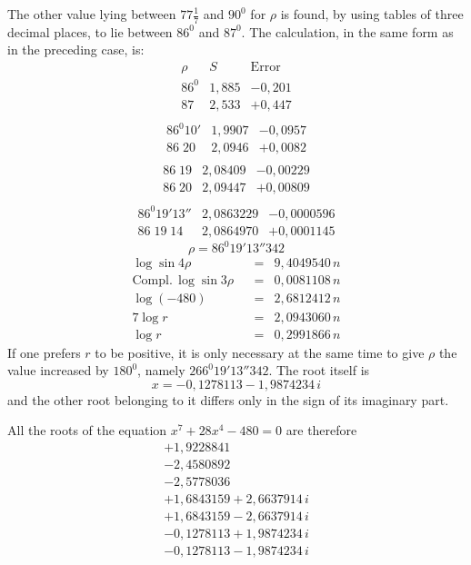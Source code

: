 The other value lying between $77\frac{1}{7}$ and $90^{0}$ for $\rho$ is found, by using tables of three decimal places, to lie between $86^{0}$ and $87^{0}$. The calculation, in the same form as in the preceding case, is:
\[
\begin{array}{c|r|r}
\rho&S&\mathrm{Error}\\
86^{0}&1{,}885&-0{,}201\\
87&2{,}533&+0{,}447\\
\end{array}
\]
\[
\begin{array}{c|r|r}
86^{0}10'&1{,}9907&-0{,}0957\\
86\;20&2{,}0946&+0{,}0082\\
\end{array}
\]
\[
\begin{array}{c|r|r}
86\;19&2{,}08409&-0{,}00229\\
86\;20&2{,}09447&+0{,}00809\\
\end{array}
\]
\[
\begin{array}{c|r|r}
86^{0}19'13''&2{,}0863229&-0{,}0000596\\
86\;19\;14&2{,}0864970&+0{,}0001145
\end{array}
\]
\[
\rho=86^{0}19'13''342
\]
\[
\begin{array}{lrcl}
\log\sin4\rho&&=&9{,}4049540\,n\\
\mathrm{Compl.}\,\log\sin3\rho&&=&0{,}0081108\,n\\
\log(-480)&&=&2{,}6812412\,n\\\hline
7\log r&&=&2{,}0943060\,n\\
\log r&&=&0{,}2991866\,n
\end{array}
\]
If one prefers $r$ to be positive, it is only necessary at the same time to give $\rho$ the value increased by $180^{0}$, namely $266^{0}19'13''342$. The root itself is
\[
x=-0{,}1278113-1{,}9874234\,i
\]
and the other root belonging to it differs only in the sign of its imaginary part.
\par{}
All the roots of the equation $x^7+28x^4-480=0$ are therefore
\[
\begin{array}{l}
+1{,}9228841\\
-2{,}4580892\\
-2{,}5778036\\
+1{,}6843159+2{,}6637914\,i\\
+1{,}6843159-2{,}6637914\,i\\
-0{,}1278113+1{,}9874234\,i\\
-0{,}1278113-1{,}9874234\,i
\end{array}
\]
